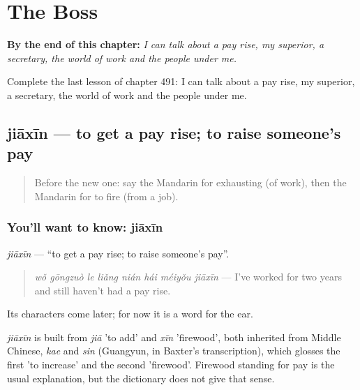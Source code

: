 
\chapter{The Boss}
\label{ch:zh-the-boss}

\begin{chapteropening}
\textbf{By the end of this chapter:} \emph{I can talk about a pay rise, my superior, a secretary, the world of work and the people under me.}

Complete the last lesson of chapter 491: I can talk about a pay rise, my superior, a secretary, the world of work and the people under me.
\end{chapteropening}

\section[jiāxīn]{jiāxīn — to get a pay rise; to raise someone's pay}

\label{lesson:ZH-C491-jiaxin}



\begin{quote}
Before the new one: say the Mandarin for exhausting (of work), then the Mandarin for to fire (from a job).
\end{quote}

\subsection*{You'll want to know: jiāxīn}
\emph{jiāxīn} — \textquotedblleft{}to get a pay rise; to raise someone's pay\textquotedblright{}.

\begin{quote}
\emph{wǒ gōngzuò le liǎng nián hái méiyǒu jiāxīn} — I've worked for two years and still haven't had a pay rise.
\end{quote}

Its characters come later; for now it is a word for the ear.

\begin{cousinweb}
\emph{jiāxīn} is built from \emph{jiā} 'to add' and \emph{xīn} 'firewood', both inherited from Middle Chinese, \emph{kae} and \emph{sin} (Guangyun, in Baxter's transcription), which glosses the first 'to increase' and the second 'firewood'. Firewood standing for pay is the usual explanation, but the dictionary does not give that sense.
\end{cousinweb}


